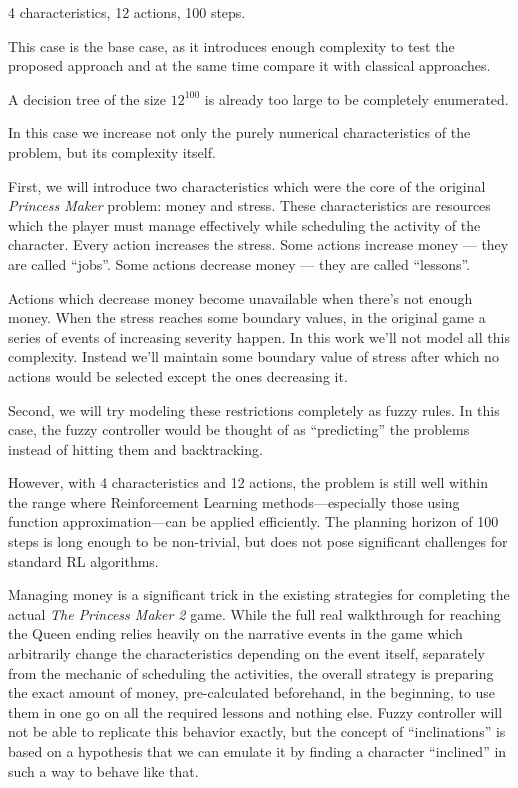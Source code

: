 \documentclass[12pt, a4paper]{article}
\begin{document}
	4 characteristics, 12 actions, 100 steps.

	This case is the base case, as it introduces enough complexity to test the proposed approach and at the same time compare it with classical approaches.

	A decision tree of the size $12^{100}$ is already too large to be completely enumerated.

	In this case we increase not only the purely numerical characteristics of the problem, but its complexity itself.
	
	First, we will introduce two characteristics which were the core of the original \textit{Princess Maker} problem: money and stress.
	These characteristics are resources which the player must manage effectively while scheduling the activity of the character.
	Every action increases the stress.
	Some actions increase money --- they are called ``jobs''.
	Some actions decrease money --- they are called ``lessons''.
	
	Actions which decrease money become unavailable when there's not enough money.
	When the stress reaches some boundary values, in the original game a series of events of increasing severity happen.
	In this work we'll not model all this complexity.
	Instead we'll maintain some boundary value of stress after which no actions would be selected except the ones decreasing it.
	
	Second, we will try modeling these restrictions completely as fuzzy rules.
	In this case, the fuzzy controller would be thought of as ``predicting'' the problems instead of hitting them and backtracking.

	However, with 4 characteristics and 12 actions, the problem is still well within the range where Reinforcement Learning methods—especially those using function approximation—can be applied efficiently.
	The planning horizon of 100 steps is long enough to be non-trivial, but does not pose significant challenges for standard RL algorithms.


	Managing money is a significant trick in the existing strategies for completing the actual \textit{The Princess Maker 2} game.
	While the full real walkthrough for reaching the Queen ending relies heavily on the narrative events in the game which arbitrarily change the characteristics depending on the event itself, separately from the mechanic of scheduling the activities, the overall strategy is preparing the exact amount of money, pre-calculated beforehand, in the beginning, to use them in one go on all the required lessons and nothing else.
	Fuzzy controller will not be able to replicate this behavior exactly, but the concept of ``inclinations'' is based on a hypothesis that we can emulate it by finding a character ``inclined'' in such a way to behave like that.
	
\end{document}
